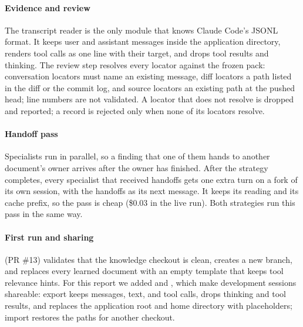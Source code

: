 \paragraph{Evidence and review} The transcript reader is the only module that knows Claude Code's JSONL format. It keeps user and assistant messages inside the application directory, renders tool calls as one line with their target, and drops tool results and thinking. The review step resolves every locator against the frozen pack: conversation locators must name an existing message, diff locators a path listed in the diff or the commit log, and source locators an existing path at the pushed head; line numbers are not validated. A locator that does not resolve is dropped and reported; a record is rejected only when none of its locators resolve.

\paragraph{Handoff pass} Specialists run in parallel, so a finding that one of them hands to another document's owner arrives after the owner has finished. After the strategy completes, every specialist that received handoffs gets one extra turn on a fork of its own session, with the handoffs as its next message. It keeps its reading and its cache prefix, so the pass is cheap (\$0.03 in the live run). Both strategies run this pass in the same way.

\paragraph{First run and sharing}  (PR \#13) validates that the knowledge checkout is clean, creates a new branch, and replaces every learned document with an empty template that keeps tool relevance hints. For this report we added  and , which make development sessions shareable: export keeps messages, text, and tool calls, drops thinking and tool results, and replaces the application root and home directory with placeholders; import restores the paths for another checkout.

